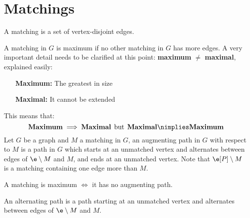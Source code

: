 \chapter{Matchings}
\begin{definition}[Matching]
    A matching is a set of vertex-disjoint edges.    
\end{definition}
A matching in $G$ is maximum if no other matching in $G$ has more edges. A very important detail needs to be clarified at this point: \textbf{maximum} $\neq$ \textbf{maximal}, explained easily:
\begin{itemize}
    \item [\textbf{Maximum:}] The greatest in size
    \item [\textbf{Maximal:}] It cannot be extended
\end{itemize}
This means that:
\begin{equation}
    \text{\textbf{Maximum}} \implies \text{\textbf{Maximal}} \:\:\text{but}\:\: \text{\textbf{Maximal}} \nimplies \text{\textbf{Maximum}}
\end{equation}
Let $G$ be a graph and $M$ a matching in $G$, an augmenting path in $G$ with respect to $M$ is a path in $G$ which starts at an unmatched vertex and alternates between edges of $\e \setminus M$ and $M$, and ends at an unmatched vertex. Note that $\e[P] \setminus M$ is a matching containing one edge more than $M$.
\begin{customlemma}{2.1}
\label{lemma:2.1}
    A matching is maximum $\iff$ it has no augmenting path.
\end{customlemma}
An alternating path is a path starting at an unmatched vertex and alternates between edges of $\e \setminus M$ and $M$.
